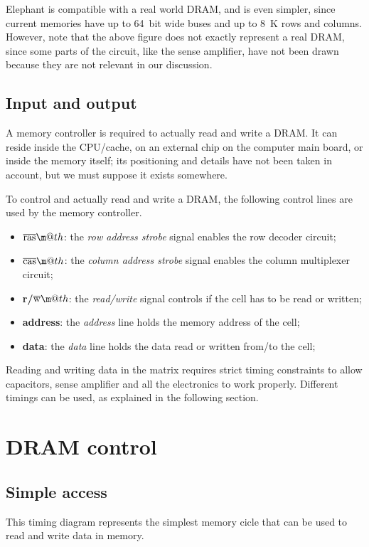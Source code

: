 \documentclass[a4paper,12pt]{article}
\makeatletter
\newcommand*{\textoverline}[1]{$\overline{\hbox{#1}}\m@th$}
\newcommand{\memoryname}{Elephant}
\makeatother
\begin{document}
\memoryname{} is compatible with a real world DRAM, and is even simpler, since current memories have up to 64~bit wide buses and up to 8~K rows and columns.
\\
However, note that the above figure does not exactly represent a real DRAM, since some parts of the circuit, like the sense amplifier, have not been drawn because they are not relevant in our discussion.

\subsection{Input and output}
A memory controller is required to actually read and write a DRAM.
It can reside inside the CPU/cache, on an external chip on the computer main board, or inside the memory itself; its positioning and details have not been taken in account, but we must suppose it exists somewhere.

To control and actually read and write a DRAM, the following control lines are used by the memory controller.

\begin{itemize}
  \item \textbf{\textoverline{ras}}: the \emph{row address strobe} signal enables the row decoder circuit;
  \item \textbf{\textoverline{cas}}: the \emph{column address strobe} signal enables the column multiplexer circuit;
  \item \textbf{r/\textoverline{w}}: the \emph{read/write} signal controls if the cell has to be read or written;
  \item \textbf{address}: the \emph{address} line holds the memory address of the cell;
  \item \textbf{data}: the \emph{data} line holds the data read or written from/to the cell;
\end{itemize}

Reading and writing data in the matrix requires strict timing constraints to allow capacitors, sense amplifier and all the electronics to work properly.
Different timings can be used, as explained in the following section.

\section{DRAM control}

\subsection{Simple access}
This timing diagram represents the simplest memory cicle that can be used to read and write data in memory.
\end{document}
